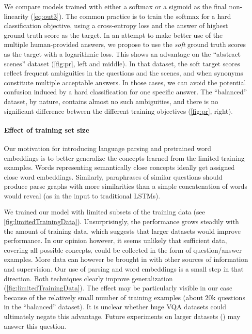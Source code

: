 We compare models trained with either a softmax or a sigmoid as the final non-linearity (\eq\ref{eq:out3}). The common practice is to train the softmax for a hard classification objective, using a cross-entropy loss and the answer of highest ground truth score as the target. In an attempt to make better use of the multiple human-provided answers, we propose to use the \emph{soft} ground truth scores as the target with a logarithmic loss. This shows an advantage on the ``abstract scenes'' dataset (\fig\ref{fig:pr}, left and middle). In that dataset, the soft target scores reflect frequent ambiguities in the questions and the scenes, and when synonyms constitute multiple acceptable answers. In those cases, we can avoid the potential confusion induced by a hard classification for one specific answer. The ``balanced'' dataset, by nature, contains almost no such ambiguities, and there is no significant difference between the different training objectives (\fig\ref{fig:pr}, right).

\paragraph{Effect of training set size}
Our motivation for introducing language parsing and pretrained word embeddings is to better generalize the concepts learned from the limited training examples. Words representing semantically close concepts ideally get assigned close word embeddings. Similarly, paraphrases of similar questions should produce parse graphs with more similarities than a simple concatenation of words would reveal (as in the input to traditional LSTMs).

We trained our model with limited subsets of the training data (see \fig\ref{fig:limitedTrainingData}). Unsurprisingly, the performance grows steadily with the amount of training data, which suggests that larger datasets would improve performance. In our opinion however, it seems unlikely that sufficient data, covering all possible concepts, could be collected in the form of question/answer examples. More data can however be brought in with other sources of information and supervision. Our use of parsing and word embeddings is a small step in that direction. Both techniques clearly improve generalization (\fig\ref{fig:limitedTrainingData}). The effect may be particularly visible in our case because of the relatively small number of training examples (about $20$k questions in the ``balanced'' dataset). It is unclear whether huge VQA datasets could ultimately negate this advantage. Future experiments on larger datasets (\eg \cite{krishnavisualgenome}) may answer this question.

